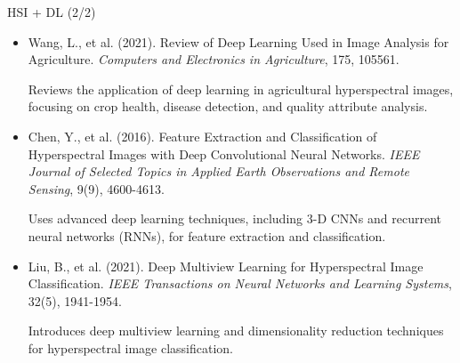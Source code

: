 \documentclass[10pt,svgnames,fragile]{beamer}
\begin{document}
\begin{frame}{HSI + DL (2/2)}
\footnotesize
\begin{itemize}
    \item Wang, L., et al. (2021). Review of Deep Learning Used in Image Analysis for Agriculture. \textit{Computers and Electronics in Agriculture}, 175, 105561. \href{https://consensus.app/papers/review-learning-used-image-analysis-agriculture-wang/68e0e3e870035e8eb2698f31d1c8c364/?utm_source=chatgpt}{\color{blue}{DOI: 10.1016/j.compag.2020.105561}}

    {\color{gray}Reviews the application of deep learning in agricultural hyperspectral images, focusing on crop health, disease detection, and quality attribute analysis.}

    \item Chen, Y., et al. (2016). Feature Extraction and Classification of Hyperspectral Images with Deep Convolutional Neural Networks. \textit{IEEE Journal of Selected Topics in Applied Earth Observations and Remote Sensing}, 9(9), 4600-4613. \href{https://consensus.app/papers/feature-extraction-classification-hyperspectral-images-chen/966c8029a2295c7b8f9cb04e4be39ad9/?utm_source=chatgpt}{\color{blue}{DOI: 10.1109/JSTARS.2016.2619742}}

    {\color{gray}Uses advanced deep learning techniques, including 3-D CNNs and recurrent neural networks (RNNs), for feature extraction and classification.}

    \item Liu, B., et al. (2021). Deep Multiview Learning for Hyperspectral Image Classification. \textit{IEEE Transactions on Neural Networks and Learning Systems}, 32(5), 1941-1954. \href{https://consensus.app/papers/deep-multiview-learning-hyperspectral-image-liu/9eb84004885252c1ae9b997d560673ca/?utm_source=chatgpt}{\color{blue}{DOI: 10.1109/TNNLS.2020.2997472}}

     {\color{gray}Introduces deep multiview learning and dimensionality reduction techniques for hyperspectral image classification.}
\end{itemize}
\end{frame}
\end{document}
